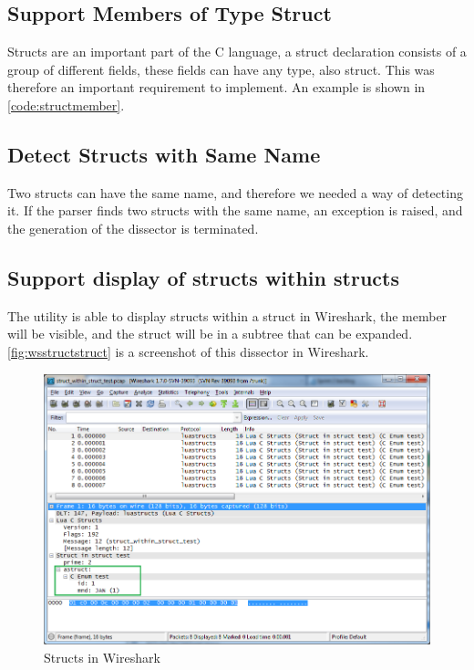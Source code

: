 

\subsection{Support Members of Type Struct}
Structs are an important part of the C language, a struct declaration consists 
of a group of different fields, these fields can have any type, also struct. 
This was therefore an important requirement to implement. An example is shown 
in \autoref{code:structmember}.



\subsection{Detect Structs with Same Name}
Two structs can have the same name, and therefore we needed a way of detecting it. 
If the parser finds two structs with the same name, an exception is 
raised, and the generation of the dissector is terminated.

\subsection{Support display of structs within structs}
The utility is able to display structs within a struct in Wireshark, the 
member will be visible, and the struct will be in a subtree that can be 
expanded. \autoref{fig:wsstructstruct} is a screenshot of this dissector in 
Wireshark.

\begin{figure}[ht]
	\center
	\includegraphics[width=\textwidth]{./sprints/img/wireshark_structwithstruct}
	\caption{Structs in Wireshark\label{fig:wsstructstruct}}
\end{figure}

